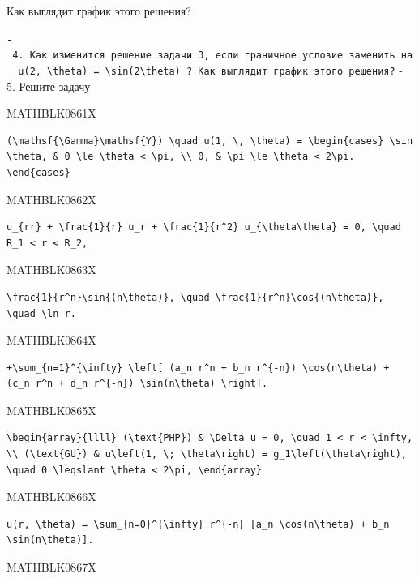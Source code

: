 \documentclass[
  ukrainian,
]{article}
\begin{document}
Как выглядит график этого решения?

\texttt{-\ 4.\ Как\ изменится\ решение\ задачи\ 3,\ если\ граничное\ условие\ заменить\ на\ \ \textquotesingle{}u(2,\ \textbackslash{}theta)\ =\ \textbackslash{}sin(2\textbackslash{}theta)\textquotesingle{}\ ?\ Как\ выглядит\ график\ этого\ решения?}
- 5. Решите задачу

MATHBLK0861X

\begin{verbatim}
(\mathsf{\Gamma}\mathsf{Y}) \quad u(1, \, \theta) = \begin{cases} \sin \theta, & 0 \le \theta < \pi, \\ 0, & \pi \le \theta < 2\pi. \end{cases}
\end{verbatim}

MATHBLK0862X

\begin{verbatim}
u_{rr} + \frac{1}{r} u_r + \frac{1}{r^2} u_{\theta\theta} = 0, \quad R_1 < r < R_2,
\end{verbatim}

MATHBLK0863X

\begin{verbatim}
\frac{1}{r^n}\sin{(n\theta)}, \quad \frac{1}{r^n}\cos{(n\theta)}, \quad \ln r.
\end{verbatim}

MATHBLK0864X

\begin{verbatim}
+\sum_{n=1}^{\infty} \left[ (a_n r^n + b_n r^{-n}) \cos(n\theta) + (c_n r^n + d_n r^{-n}) \sin(n\theta) \right].
\end{verbatim}

MATHBLK0865X

\begin{verbatim}
\begin{array}{llll} (\text{PHP}) & \Delta u = 0, \quad 1 < r < \infty, \\ (\text{GU}) & u\left(1, \; \theta\right) = g_1\left(\theta\right), \quad 0 \leqslant \theta < 2\pi, \end{array}
\end{verbatim}

MATHBLK0866X

\begin{verbatim}
u(r, \theta) = \sum_{n=0}^{\infty} r^{-n} [a_n \cos(n\theta) + b_n \sin(n\theta)].
\end{verbatim}

MATHBLK0867X
\end{document}
